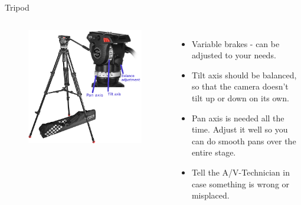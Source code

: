 \documentclass[hyperref={pdfpagelabels=false}]{beamer}
\begin{document}
\begin{frame}{Tripod}
	\begin{columns}[T,onlytextwidth]
	\begin{figure} 
		\centering
		\includegraphics[width=1\textwidth]{tripod-complete.png}
	\end{figure}
	\begin{itemize}
			\item Variable brakes - can be adjusted to your needs.
			\item Tilt axis should be balanced, so that the camera doesn't tilt up or down on its own.
			\item Pan axis is needed all the time. Adjust it well so you can do smooth pans over the entire stage.
			\item Tell the A/V-Technician in case something is wrong or misplaced.
		\end{itemize}
	\end{columns}
\end{frame}
\end{document}
